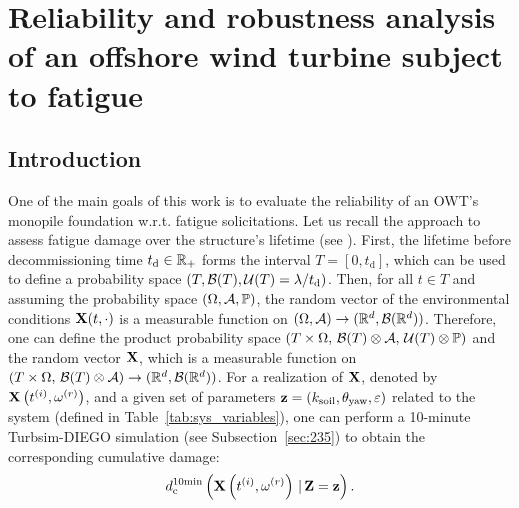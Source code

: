 \cleardoublepage
\chapter{Reliability and robustness analysis of an offshore wind turbine subject to fatigue}
\label{chpt:7}
\hfill
\localtableofcontents
\newpage

\section{Introduction}
One of the main goals of this work is to evaluate the reliability of an OWT's monopile foundation w.r.t. fatigue solicitations. 
Let us recall the approach to assess fatigue damage over the structure's lifetime (see \citealp[Appendix H]{iec_2019}). 
First, the lifetime before decommissioning time $t_{\mathrm{d}}\in\mathbb{R}_+$ forms the interval $T=[0, t_{\mathrm{d}}]$, which can be used to define a probability space $(T, \mathcal{B}(T), \mathcal{U}(T)=\lambda / t_{\mathrm{d}})$. 
Then, for all $t\in T$ and assuming the probability space $(\Omega, \mathcal{A}, \mathbb{P})$, the random vector of the environmental conditions ${\bf X}(t, \cdot)$ is a measurable function on $(\Omega, \mathcal{A}) \rightarrow (\mathbb{R}^d, \mathcal{B}(\mathbb{R}^d))$.  
Therefore, one can define the product probability space $(T\times\Omega, \, \mathcal{B}(T) \otimes \mathcal{A}, \, \mathcal{U}(T) \otimes \mathbb{P})$ and the random vector ${\bf X}$, which is a measurable function on $(T \times \Omega, \, \mathcal{B}(T) \otimes \mathcal{A}) \rightarrow (\mathbb{R}^d, \mathcal{B}(\mathbb{R}^d))$.  
For a realization of ${\bf X}$, denoted by ${\bf X}\left(t^{(i)}, \omega^{(r)}\right)$, and a given set of parameters ${\bf z}=\left(k_{\mathrm{soil}}, \theta_{\mathrm{yaw}}, \varepsilon\right)$ related to the system (defined in Table~\ref{tab:sys_variables}), one can perform a 10-minute Turbsim-DIEGO simulation (see Subsection~\ref{sec:235}) to obtain the corresponding cumulative damage:
\begin{equation}
    d_{\mathrm{c}}^{10\mathrm{min}}\left({\bf X}\left(t^{(i)}, \omega^{(r)}\right)\,|\,{\bf Z}={\bf z}\right). 
\end{equation}
